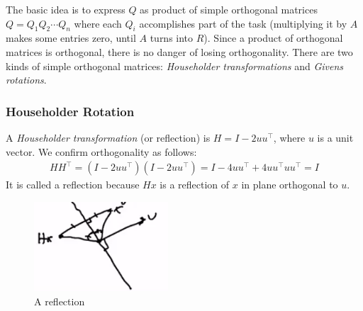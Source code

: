 \documentclass[11pt]{article}
\numberwithin{equation}{section}
\begin{document}
The basic idea is to express $Q$ as product of simple orthogonal matrices $Q=Q_1 Q_2 \cdots Q_n$ where each $Q_i$ accomplishes part of the task
(multiplying it by $A$ makes some entries zero, until $A$ turns into $R$). Since a product of orthogonal matrices is orthogonal, there is no danger of losing orthogonality.
There are two kinds of simple orthogonal matrices: \textit{Householder transformations} and \textit{Givens rotations}.

\subsubsection{Householder Rotation}
A \textit{Householder transformation} (or reflection) is $H = I-2uu^\top$,
where $u$ is a unit vector. We confirm orthogonality as follows: \begin{align*}
    HH^\top = (I-2uu^\top )(I-2uu^\top ) = I - 4uu^\top + 4uu^\top uu^\top  = I
\end{align*}
It is called a reflection because $Hx$ is a reflection of $x$ in plane orthogonal to $u$.

\begin{figure}[h]
    \centering
    \includegraphics[width=5cm]{images/lec7-1.png}
    \caption{A reflection}
\end{figure}
\end{document}

